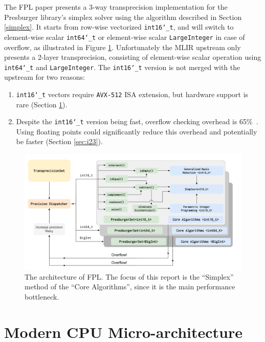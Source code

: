 \documentclass[logo,bsc,singlespacing,parskip]{infthesis}
\newcommand{\dtshort}{\texttt{int16\char`_t}}
\newcommand{\dtlong}{\texttt{int64\char`_t}}
\newenvironment{compactlist}
{ \begin{enumerate}
    \setlength{\itemsep}{0pt}
    \setlength{\parskip}{0pt}
    \setlength{\parsep}{0pt}     
}
{ \end{enumerate} }
\begin{document}
The FPL paper presents a 3-way transprecision implementation for the Presburger
library's simplex solver using the algorithm described in Section \ref{simplex}.
It starts from row-wise vectorized \dtshort{}, and will switch to  element-wise
scalar \dtlong{} or element-wise scalar \texttt{LargeInteger} in case of
overflow, as illustrated in Figure \ref{fig:fpl_arch}. Unfortunately the
MLIR upstream only presents a 2-layer transprecision, consisting of element-wise
scalar operation using \dtlong{} and \texttt{LargeInteger}. The \dtshort{}
version is not merged with the upstream for two reasons: 
\begin{compactlist} 
    \item \dtshort{} vectors require \texttt{AVX-512} ISA extension, but hardware
    support is rare (Section \ref{sec:avx512}). 
    \item Despite the \dtshort{} version being fast, overflow checking overhead
    is 65\%~\cite{FPL2}. Using floating points could significantly reduce this
    overhead and potentially be faster (Section \ref{sec:i23}).  
\end{compactlist}


\begin{figure}
    \begin{center}
    \includegraphics[width=\linewidth]{image/transprecision.png}
    \caption{The architecture of FPL. The focus of this report is the
    ``Simplex'' method of the ``Core Algorithms'', since it is the main
    performance bottleneck.~\cite{FPL2}}
    \label{fig:fpl_arch}
    \end{center}
\end{figure}

\section{Modern CPU Micro-architecture}
\label{sec:avx512}
\end{document}
